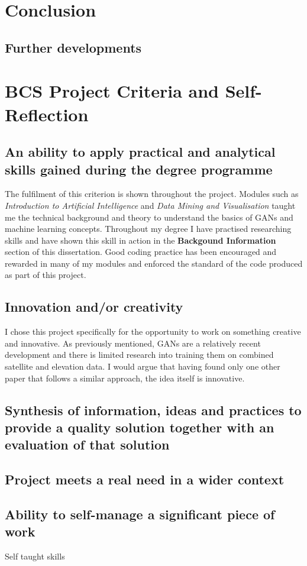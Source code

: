 \documentclass[a4paper]{report}
\begin{document}
\section{Conclusion}
\subsection{Further developments}
\section{BCS Project Criteria and Self-Reflection}
\subsection{An ability to apply practical and analytical skills gained during the degree programme}
The fulfilment of this criterion is shown throughout the project. Modules such as \textit{Introduction to Artificial Intelligence} and \textit{Data Mining and Visualisation} taught me the technical background and theory to understand the basics of GANs and machine learning concepts. Throughout my degree I have practised researching skills and have shown this skill in action in the \textbf{Backgound Information} section of this dissertation. Good coding practice has been encouraged and rewarded in many of my modules and enforced the standard of the code produced as part of this project.
\subsection{Innovation and/or creativity}
I chose this project specifically for the opportunity to work on something creative and innovative. As previously mentioned, GANs are a relatively recent development and there is limited research into training them on combined satellite and elevation data. I would argue that having found only one other paper that follows a similar approach, the idea itself is innovative. 
\subsection{Synthesis of information, ideas and practices to provide a quality solution together with an evaluation of that solution}
\subsection{Project meets a real need in a wider context}
\subsection{Ability to self-manage a significant piece of work}
Self taught skills
\end{document}
